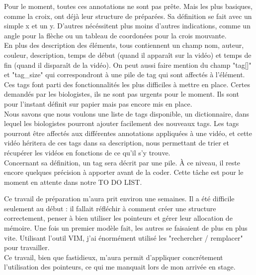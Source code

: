 \documentclass[11pt,french,a4paper]{report}
\begin{document}
Pour le moment, toutes ces annotations ne sont pas prête. Mais les plus basiques, comme la croix, ont déjà leur structure de préparées.
Sa définition se fait avec un simple x et un y. D'autres nécéssitent plus moins d'autres indications, comme un angle pour la flèche
ou un tableau de coordonées pour la crois mouvante. \\

En plus des description des éléments, tous contiennent un champ nom, auteur, couleur, description, temps de début 
(quand il apparaît sur la vidéo) et temps de fin (quand il disparaît de la vidéo). 
On peut aussi faire mention du champ "tag[]" et "tag\_size" qui correspondront à une pile de tag qui sont affectés à l'élément. \\

Ces tags font parti des fonctionnalités les plus difficiles à mettre en place. Certes demandés par les biologistes, ils ne sont 
pas urgents pour le moment. Ils sont pour l'instant définit sur papier mais pas encore mis en place. \\
Nous savons que nous voulons une liste de tags disponible, un dictionnaire, dans lequel les biologistes pourront 
ajouter facilement des nouveaux tags. Les tags pourront être affectés aux différentes annotations appliquées
à une vidéo, et cette vidéo héritera de ces tags dans sa description, nous permettant de trier et récupérer les vidéos 
en fonctions de ce qu'il s'y trouve. \\
Concernant sa définition, un tag sera décrit par une pile. À ce niveau, il reste encore quelques précision à apporter
avant de la coder. Cette tâche est pour le moment en attente dans notre TO DO LIST. 


Ce travail de préparation m'aura prit environ une semaines. Il a été difficile seulement au début : il fallait réfléchir 
à comment créer une structure correctement, penser à bien utiliser les pointeurs et gérer leur allocation de
mémoire. Une fois un premier modèle fait, les autres se faisaient de plus en plus vite. Utilisant l'outil VIM, j'ai 
énormément utilisé les "rechercher / remplacer" pour travailler. \\
Ce travail, bien que fastidieux, m'aura permit d'appliquer concrétement l'utilisation des pointeurs, ce qui 
me manquait lors de mon arrivée en stage. \\ 
\end{document}
